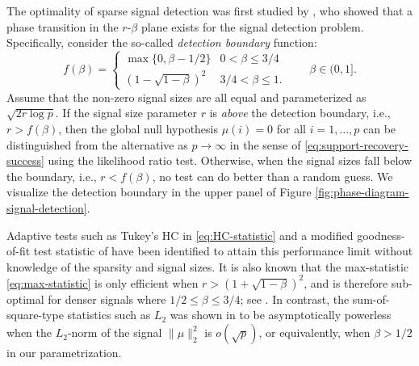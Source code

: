 
The optimality of sparse signal detection was first studied by \citet{ingster1998minimax}, who showed that a phase transition in the $r$-$\beta$ plane exists for the signal detection problem. 
Specifically, consider the so-called {\em detection boundary} function:
\begin{equation} \label{eq:detection-boundary-large-signals}
    f(\beta) = 
    \begin{cases}
        \max\{0,\beta -1/2\} & 0<\beta\le 3/4\\
        \left(1 - \sqrt{1-\beta}\right)^2 & 3/4 < \beta \le 1.
    \end{cases}
    \quad\quad \beta\in (0,1].
\end{equation} 
Assume that the non-zero signal sizes are all equal and parameterized as $\sqrt{2{r}\log{p}}$.
If the signal size parameter $r$ is {\em above} the detection boundary, i.e., $r>f(\beta)$, then the global null 
hypothesis $\mu(i)=0$ for all $i=1,\dots,p$ can be distinguished from the alternative as $p\to\infty$ in the sense of \eqref{eq:support-recovery-success} using the likelihood ratio test.  Otherwise, when the signal sizes fall below the boundary, i.e., $r< f(\beta)$, no test can do better than a 
random guess.  We visualize the detection boundary in the upper panel of Figure
\ref{fig:phase-diagram-signal-detection}.

Adaptive tests such as Tukey's \ac{HC} in \eqref{eq:HC-statistic} \citep{donoho2004higher} and a modified 
goodness-of-fit test statistic of \citet{zhang2002powerful} have been identified to attain this performance limit 
without knowledge of the sparsity and signal sizes. It is also known that the max-statistic \eqref{eq:max-statistic} is only efficient when $r>(1+\sqrt{1-\beta})^2$, and is therefore sub-optimal for denser signals where $1/2\le\beta\le 3/4$; see \cite{cai2011optimal}.
In contrast, the sum-of-square-type statistics such as $L_2$ was shown in \cite{fan1996test} to be asymptotically powerless when the $L_2$-norm of the signal $\|\mu\|_2^2$ is $o(\sqrt{p})$, or equivalently, when $\beta>1/2$ in our parametrization.

